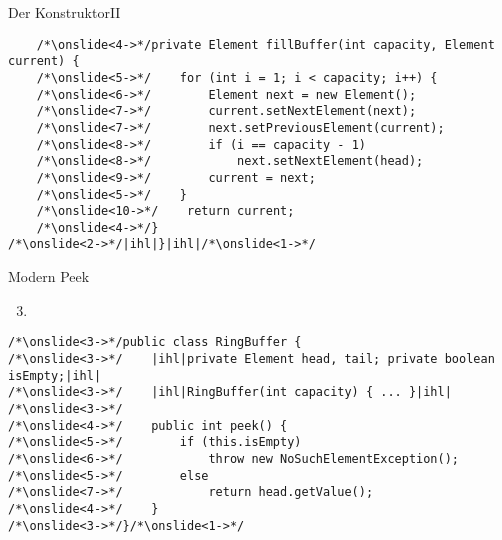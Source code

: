 {\begin{frame}[fragile,c]{Der Konstruktor\hfill II}
\begin{verbatim}
    /*\onslide<4->*/private Element fillBuffer(int capacity, Element current) {
    /*\onslide<5->*/    for (int i = 1; i < capacity; i++) {
    /*\onslide<6->*/        Element next = new Element();
    /*\onslide<7->*/        current.setNextElement(next);
    /*\onslide<7->*/        next.setPreviousElement(current);
    /*\onslide<8->*/        if (i == capacity - 1)
    /*\onslide<8->*/            next.setNextElement(head);
    /*\onslide<9->*/        current = next;
    /*\onslide<5->*/    }
    /*\onslide<10->*/    return current;
    /*\onslide<4->*/}
/*\onslide<2->*/|ihl|}|ihl|/*\onslide<1->*/
\end{verbatim}
\end{frame}

\begin{frame}[fragile]{Modern Peek}
\begin{enumerate}[<+(1)->]
    \setcounter{enumi}{2}
    \item {}
\end{enumerate}
\SetupLstHl
\begin{verbatim}
/*\onslide<3->*/public class RingBuffer {
/*\onslide<3->*/    |ihl|private Element head, tail; private boolean isEmpty;|ihl|
/*\onslide<3->*/    |ihl|RingBuffer(int capacity) { ... }|ihl|
/*\onslide<3->*/
/*\onslide<4->*/    public int peek() {
/*\onslide<5->*/        if (this.isEmpty)
/*\onslide<6->*/            throw new NoSuchElementException();
/*\onslide<5->*/        else
/*\onslide<7->*/            return head.getValue();
/*\onslide<4->*/    }
/*\onslide<3->*/}/*\onslide<1->*/
\end{verbatim}
\end{frame}

}
